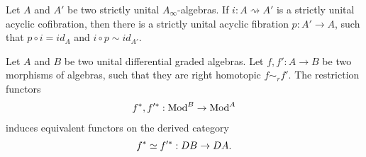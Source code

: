 \documentclass[../thesis.tex]{subfiles}
\begin{document}
            \begin{lemma}{{\cite[Proposition 3.2.4.5][106]{LefevreHasegawa03}}}\label{lem: inf-cofib-is-split}
                Let $A$ and $A'$ be two strictly unital $A_\infty$-algebras. If $i: A \rightsquigarrow A'$ is a strictly unital acyclic cofibration, then there is a strictly unital acyclic fibration $p: A' \rightarrow A$, such that $p\circ i = id_A$ and $i \circ p \sim id_{A'}$.
            \end{lemma}

            \begin{lemma}{\cite[Lemme 4.1.3.15][128]{LefevreHasegawa03}}\label{lem: homotopic-mor-is-same}
                Let $A$ and $B$ be two unital differential graded algebras. Let $f, f': A \rightarrow B$ be two morphisms of algebras, such that they are right homotopic $f \sim_r f'$. The restriction functors
                \begin{align}
                    f^*, f'^* : \tt{Mod}^B \rightarrow \tt{Mod}^A
                \end{align}
                induces equivalent functors on the derived category
                \begin{align*}
                    f^* \simeq f'^* : DB \rightarrow DA\tt{.}
                \end{align*}
            \end{lemma}
\end{document}
